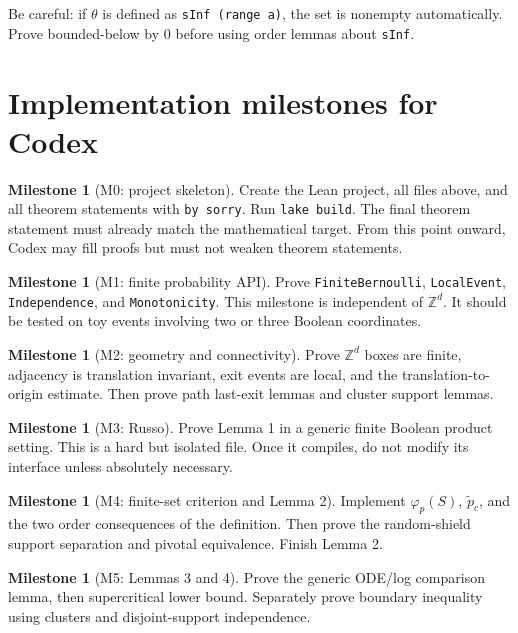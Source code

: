 \documentclass[11pt]{article}
\newcommand{\Z}{\mathbb Z}
\newcommand{\ptilde}{\widetilde p_c}
\theoremstyle{definition}
\newtheorem{milestone}[definition]{Milestone}
\theoremstyle{plain}
\begin{document}
Be careful: if $\theta$ is defined as \texttt{sInf (range a)}, the set is nonempty automatically.  Prove bounded-below by $0$ before using order lemmas about \texttt{sInf}.

\section{Implementation milestones for Codex}

\begin{milestone}[M0: project skeleton]
Create the Lean project, all files above, and all theorem statements with \texttt{by sorry}.  Run \texttt{lake build}.  The final theorem statement must already match the mathematical target.  From this point onward, Codex may fill proofs but must not weaken theorem statements.
\end{milestone}

\begin{milestone}[M1: finite probability API]
Prove \texttt{FiniteBernoulli}, \texttt{LocalEvent}, \texttt{Independence}, and \texttt{Monotonicity}.  This milestone is independent of $\Z^d$.  It should be tested on toy events involving two or three Boolean coordinates.
\end{milestone}

\begin{milestone}[M2: geometry and connectivity]
Prove $\Z^d$ boxes are finite, adjacency is translation invariant, exit events are local, and the translation-to-origin estimate.  Then prove path last-exit lemmas and cluster support lemmas.
\end{milestone}

\begin{milestone}[M3: Russo]
Prove Lemma 1 in a generic finite Boolean product setting.  This is a hard but isolated file.  Once it compiles, do not modify its interface unless absolutely necessary.
\end{milestone}

\begin{milestone}[M4: finite-set criterion and Lemma 2]
Implement $\varphi_p(S)$, $\ptilde$, and the two order consequences of the definition.  Then prove the random-shield support separation and pivotal equivalence.  Finish Lemma 2.
\end{milestone}

\begin{milestone}[M5: Lemmas 3 and 4]
Prove the generic ODE/log comparison lemma, then supercritical lower bound.  Separately prove boundary inequality using clusters and disjoint-support independence.
\end{milestone}
\end{document}
